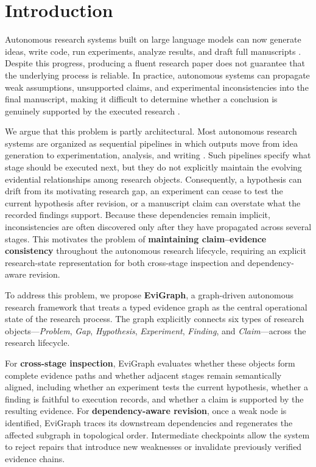 \documentclass[letterpaper]{article} %
\begin{document}
\section{Introduction}
\label{sec:intro}

Autonomous research systems built on large language models can now generate
ideas, write code, run experiments, analyze results, and draft full manuscripts
\citep{lu2024aiscientist,schmidgall2025agentlab,internagent2025,m2024augmenting,jansen2024discoveryworld}. Despite this progress, producing a fluent research paper does not guarantee that the underlying process is reliable. In practice, autonomous systems can propagate weak assumptions, unsupported claims, and experimental inconsistencies into the final manuscript, making it difficult to determine whether a conclusion is genuinely supported by the executed research \citep{mlrbench2025,aris2026,whyllm2026,min2023factscore}.

We argue that this problem is partly architectural. Most autonomous research
systems are organized as sequential pipelines in which outputs move from idea generation to experimentation, analysis, and writing
\citep{lu2024aiscientist,autoresearchclaw2026,autosci2026,nanoresearch2026}. Such pipelines specify what stage should be executed next, but they do not explicitly maintain the evolving evidential relationships among research objects. Consequently, a hypothesis can drift from its motivating research gap, an experiment can cease to test the current hypothesis after revision, or a manuscript claim can overstate what the recorded findings support. Because these dependencies remain implicit, inconsistencies are often discovered only after they have propagated across several stages. This motivates the problem of \textbf{maintaining claim–evidence consistency} throughout the autonomous research lifecycle, requiring an explicit research-state representation for both cross-stage inspection and dependency-aware revision.


To address this problem, we propose \textbf{EviGraph}, a graph-driven autonomous research framework that treats a typed evidence graph as the central operational state of the research process. The graph explicitly connects six types of research objects—\textit{Problem}, \textit{Gap}, \textit{Hypothesis}, \textit{Experiment}, \textit{Finding}, and \textit{Claim}—across the research lifecycle. 

For \textbf{cross-stage inspection}, EviGraph evaluates whether these objects form complete evidence paths and whether adjacent stages remain semantically aligned, including whether an experiment tests the current hypothesis, whether a finding is faithful to execution records, and whether a claim is supported by the resulting evidence. For \textbf{dependency-aware revision}, once a weak node is identified, EviGraph traces its downstream dependencies and regenerates the affected subgraph in topological order. Intermediate checkpoints allow the system to reject repairs that introduce new weaknesses or invalidate previously verified evidence chains.
\end{document}
